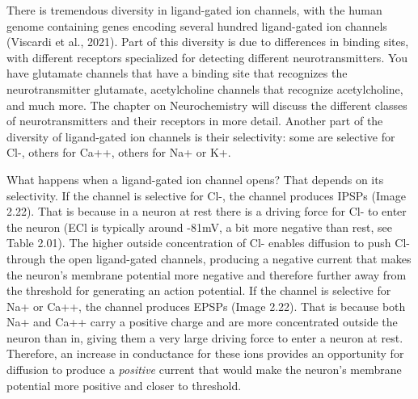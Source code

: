 \documentclass[
]{book}
\begin{document}
There is tremendous diversity in ligand-gated ion channels, with the human genome containing genes encoding several hundred ligand-gated ion channels (Viscardi et al., 2021). Part of this diversity is due to differences in binding sites, with different receptors specialized for detecting different neurotransmitters. You have glutamate channels that have a binding site that recognizes the neurotransmitter glutamate, acetylcholine channels that recognize acetylcholine, and much more. The chapter on Neurochemistry will discuss the different classes of neurotransmitters and their receptors in more detail. Another part of the diversity of ligand-gated ion channels is their selectivity: some are selective for Cl-, others for Ca++, others for Na+ or K+.

What happens when a ligand-gated ion channel opens? That depends on its selectivity. If the channel is selective for Cl-, the channel produces IPSPs (Image 2.22). That is because in a neuron at rest there is a driving force for Cl- to enter the neuron (ECl is typically around -81mV, a bit more negative than rest, see Table 2.01). The higher outside concentration of Cl- enables diffusion to push Cl- through the open ligand-gated channels, producing a negative current that makes the neuron's membrane potential more negative and therefore further away from the threshold for generating an action potential. If the channel is selective for Na+ or Ca++, the channel produces EPSPs (Image 2.22). That is because both Na+ and Ca++ carry a positive charge and are more concentrated outside the neuron than in, giving them a very large driving force to enter a neuron at rest. Therefore, an increase in conductance for these ions provides an opportunity for diffusion to produce a \emph{positive} current that would make the neuron's membrane potential more positive and closer to threshold.
\end{document}
